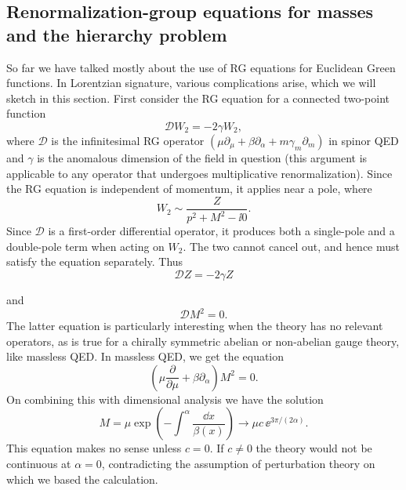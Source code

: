 \subsection{Renormalization-group equations for masses and the hierarchy problem}

So far we have talked mostly about the use of RG equations for Euclidean Green
functions. In Lorentzian signature, various complications arise, which we will
sketch in this section. First consider the RG equation for a connected
two-point function
\[
  \mathcal{D}W_2=-2\gamma W_2,
\]
where $\mathcal{D}$ is the infinitesimal RG operator
$(\mu\partial_\mu+\beta\partial_\alpha+m\gamma_m\partial_m)$ in spinor QED
and $\gamma$ is the anomalous dimension of the field in question (this
argument is applicable to any operator that undergoes multiplicative
renormalization). Since the RG equation is independent of momentum, it applies
near a pole, where
\[
  W_2\sim\frac{Z}{p^2+M^2-\ii0}.
\]
Since $\mathcal{D}$ is a first-order differential operator, it produces both a
single-pole and a double-pole term when acting on $W_2$. The two cannot cancel
out, and hence must satisfy the equation separately. Thus
\[
  \mathcal{D}Z=-2\gamma Z
\]

and
\[
  \mathcal{D}M^2=0.
\]
The latter equation is particularly interesting when the theory has no
relevant operators, as is true for a chirally symmetric abelian or non-abelian
gauge theory, like massless QED. In massless QED, we get the equation
\[
  \left(\mu\frac{\partial}{\partial\mu}+\beta\partial_\alpha\right)M^2=0.
\]
On combining this with dimensional analysis we have the solution
\[
  M=\mu\exp\!\left(-\int^\alpha\frac{\dd x}{\beta(x)}\right)
  \longrightarrow \mu c\,\ee^{3\pi/(2\alpha)}.
\]
This equation makes no sense unless $c=0$. If $c\ne0$ the theory would not be
continuous at $\alpha=0$, contradicting the assumption of perturbation theory
on which we based the calculation.

